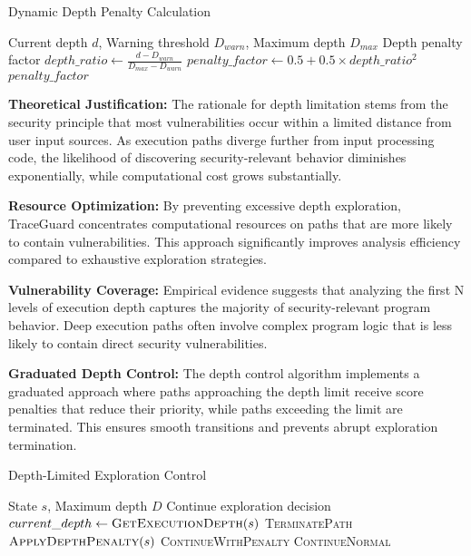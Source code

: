 \begin{algorithm}
\caption{Dynamic Depth Penalty Calculation}
\begin{algorithmic}[1]
\Require Current depth $d$, Warning threshold $D_{warn}$, Maximum depth $D_{max}$
\Ensure Depth penalty factor
\State $depth\_ratio \gets \frac{d - D_{warn}}{D_{max} - D_{warn}}$
\State $penalty\_factor \gets 0.5 + 0.5 \times depth\_ratio^2$
\State \Return $penalty\_factor$
\end{algorithmic}
\end{algorithm}

\textbf{Theoretical Justification:} The rationale for depth limitation stems from the security principle that most vulnerabilities occur within a limited distance from user input sources. As execution paths diverge further from input processing code, the likelihood of discovering security-relevant behavior diminishes exponentially, while computational cost grows substantially.

\textbf{Resource Optimization:} By preventing excessive depth exploration, TraceGuard concentrates computational resources on paths that are more likely to contain vulnerabilities. This approach significantly improves analysis efficiency compared to exhaustive exploration strategies.

\textbf{Vulnerability Coverage:} Empirical evidence suggests that analyzing the first N levels of execution depth captures the majority of security-relevant program behavior. Deep execution paths often involve complex program logic that is less likely to contain direct security vulnerabilities.

\textbf{Graduated Depth Control:} The depth control algorithm implements a graduated approach where paths approaching the depth limit receive score penalties that reduce their priority, while paths exceeding the limit are terminated. This ensures smooth transitions and prevents abrupt exploration termination.

\begin{algorithm}
\caption{Depth-Limited Exploration Control}
\begin{algorithmic}[1]
\Require State $s$, Maximum depth $D$
\Ensure Continue exploration decision
\State $current\_depth \gets \textsc{GetExecutionDepth}(s)$
    \State \Return \textsc{TerminatePath}
    \State $\textsc{ApplyDepthPenalty}(s)$
    \State \Return \textsc{ContinueWithPenalty}
\Else
    \State \Return \textsc{ContinueNormal}
\EndIf
\end{algorithmic}
\end{algorithm}

